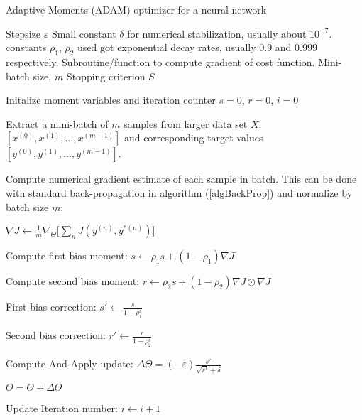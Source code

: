 \documentclass[12pt,letterpaper]{article}
\begin{document}
\begin{algorithm}[H]
\caption{Adaptive-Moments (ADAM) optimizer for a neural network}
\label{algAdaGrad}

\begin{algorithmic}
\REQUIRE Stepsize $\varepsilon$
\REQUIRE Small constant $\delta$ for numerical stabilization, usually about $10^{-7}$.
\REQUIRE constants $\rho_1$, $\rho_2$ used got exponential decay rates, usually $0.9$ and $0.999$ respectively.
\REQUIRE Subroutine/function to compute gradient of cost function.
\REQUIRE Mini-batch size, $m$
\REQUIRE Stopping criterion $S$

Initalize moment variables and iteration counter $s = 0$, $r = 0$, $i = 0$

	\item Extract a mini-batch of $m$ samples from larger data set $X$. $[x^{(0)},x^{(1)},...,x^{(m-1)}]$ and corresponding target values 
	$[y^{(0)},y^{(1)},...,y^{(m-1)}]$.
	\item Compute numerical gradient estimate of each sample in batch. This can be done with standard back-propagation in algorithm (\ref{algBackProp}) and 			 	normalize by batch size $m$:
	\item $\nabla J \leftarrow \frac{1}{m}\nabla_{\Theta} \Big[ \sum_n J(y^{(n)},y^{*(n)}) \Big] $
	
	\item Compute first bias moment: $s \leftarrow \rho_1 s + (1 - \rho_1) \nabla J$
	\item Compute second bias moment: $r \leftarrow \rho_2 s + (1 - \rho_2) \nabla J \odot \nabla J$
	\item First bias correction: $s' \leftarrow \frac{s}{1 - \rho_1^i}$
	\item Second bias correction: $r' \leftarrow \frac{r}{1 - \rho_2^i}$
	
	\item Compute And Apply update:	$\Delta \Theta = (-\varepsilon) \frac{s'}{\sqrt{r'} + \delta}$
	\item $\Theta = \Theta + \Delta \Theta$	
	\item Update Iteration number: $i \leftarrow i + 1$
\ENDWHILE

\end{algorithmic}
\end{algorithm}

\end{document}
